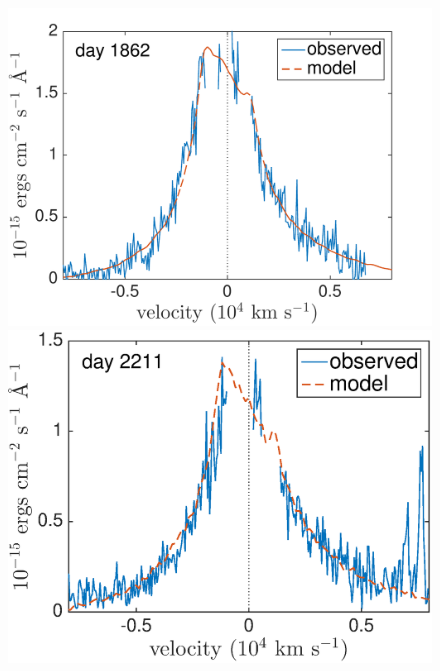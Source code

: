 \begin{figure}
\centering
\includegraphics[trim =0 35 20 0,clip=true,scale=0.39]{chapters/chapter5/images/clump_1/best_fit/d1862Ha.pdf}
\includegraphics[trim =0 35 20 0,clip=true,scale=0.39]{chapters/chapter5/images/clump_1/best_fit/d2211Ha}


\end{figure}

